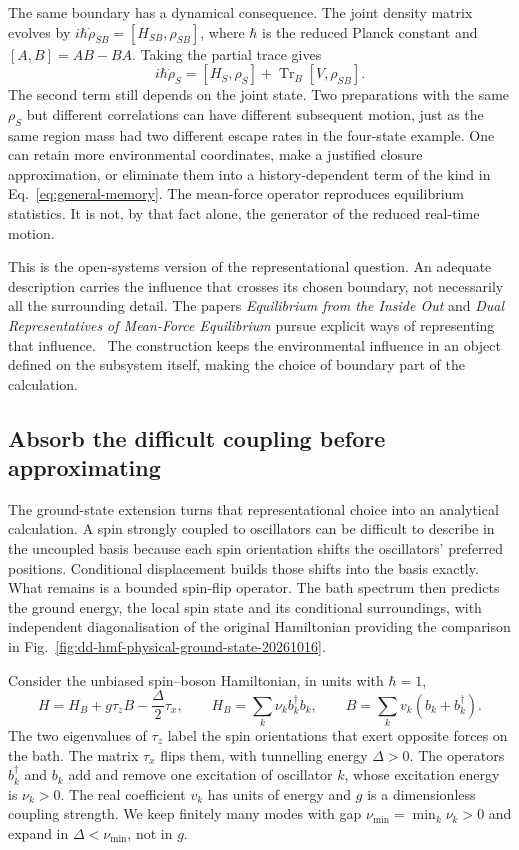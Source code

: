 The same boundary has a dynamical consequence. The joint density matrix evolves by $i\hbar\dot\rho_{SB}=[H_{SB},\rho_{SB}]$, where $\hbar$ is the reduced Planck constant and $[A,B]=AB-BA$. Taking the partial trace gives
\begin{equation}
 i\hbar\dot\rho_S=[H_S,\rho_S]
       +\operatorname{Tr}_B[V,\rho_{SB}].
 \label{eq:open-dynamical-residual}
\end{equation}
The second term still depends on the joint state. Two preparations with the same $\rho_S$ but different correlations can have different subsequent motion, just as the same region mass had two different escape rates in the four-state example. One can retain more environmental coordinates, make a justified closure approximation, or eliminate them into a history-dependent term of the kind in Eq.~\eqref{eq:general-memory}. The mean-force operator reproduces equilibrium statistics. It is not, by that fact alone, the generator of the reduced real-time motion.

This is the open-systems version of the representational question. An adequate description carries the influence that crosses its chosen boundary, not necessarily all the surrounding detail. The papers \emph{Equilibrium from the Inside Out} and \emph{Dual Representatives of Mean-Force Equilibrium} pursue explicit ways of representing that influence.~\cite{McCaulbab685} The construction keeps the environmental influence in an object defined on the subsystem itself, making the choice of boundary part of the calculation.

\subsection{Absorb the difficult coupling before approximating}
The ground-state extension turns that representational choice into an analytical calculation. A spin strongly coupled to oscillators can be difficult to describe in the uncoupled basis because each spin orientation shifts the oscillators' preferred positions. Conditional displacement builds those shifts into the basis exactly. What remains is a bounded spin-flip operator. The bath spectrum then predicts the ground energy, the local spin state and its conditional surroundings, with independent diagonalisation of the original Hamiltonian providing the comparison in Fig.~\ref{fig:dd-hmf-physical-ground-state-20261016}.~\cite{McCaul2026e37796}

Consider the unbiased spin--boson Hamiltonian, in units with $\hbar=1$,
\begin{equation}
 H=H_B+g\tau_z B-\frac{\Delta}{2}\tau_x,
 \qquad H_B=\sum_k\nu_k b_k^\dagger b_k,
 \qquad B=\sum_kv_k(b_k+b_k^\dagger).
 \label{eq:hmf-physical-model}
\end{equation}
The two eigenvalues of $\tau_z$ label the spin orientations that exert opposite forces on the bath. The matrix $\tau_x$ flips them, with tunnelling energy $\Delta>0$. The operators $b_k^\dagger$ and $b_k$ add and remove one excitation of oscillator $k$, whose excitation energy is $\nu_k>0$. The real coefficient $v_k$ has units of energy and $g$ is a dimensionless coupling strength. We keep finitely many modes with gap $\nu_{\min}=\min_k\nu_k>0$ and expand in $\Delta<\nu_{\min}$, not in $g$.

